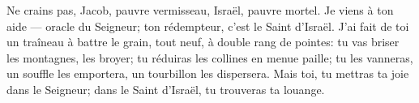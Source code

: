 Ne crains pas, Jacob, pauvre vermisseau,
	Israël, pauvre mortel.
Je viens à ton aide --- oracle du Seigneur;
	ton rédempteur, c’est le Saint d’Israël.
J’ai fait de toi un traîneau à battre le grain,
	tout neuf, à double rang de pointes:
	tu vas briser les montagnes, les broyer;
	tu réduiras les collines en menue paille;
	tu les vanneras, un souffle les emportera,
	un tourbillon les dispersera.
Mais toi, tu mettras ta joie dans le Seigneur;
	dans le Saint d’Israël, tu trouveras ta louange.
